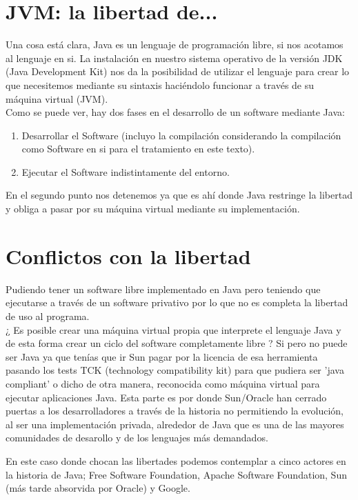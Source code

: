 \documentclass[11pt]{scrartcl}
\begin{document}
\section{JVM: la libertad de...}

Una cosa está clara, Java es un lenguaje de programación libre, si nos acotamos al lenguaje en si. La instalación en nuestro sistema operativo de la versión JDK (Java Development Kit) nos da la posibilidad de utilizar el lenguaje para crear lo que necesitemos mediante su sintaxis haciéndolo funcionar a través de su máquina virtual (JVM).\\
Como se puede ver, hay dos fases en el desarrollo de un software mediante Java:
\begin{enumerate}
\item Desarrollar el Software (incluyo la compilación considerando la compilación como Software en si para el tratamiento en este texto).
\item Ejecutar el Software indistintamente del entorno.
\end{enumerate}

En el segundo punto nos detenemos ya que es ahí donde Java restringe la libertad y obliga a pasar por su máquina virtual mediante su implementación.

\section{Conflictos con la libertad}

Pudiendo tener un software libre implementado en Java pero teniendo que ejecutarse a través de un software privativo por lo que no es completa la libertad de uso al programa.\\
¿ Es posible crear una máquina virtual propia que interprete el lenguaje Java y de esta forma crear un ciclo del software completamente libre ? Si pero no puede ser Java ya que tenías que ir Sun pagar por la licencia de esa herramienta pasando los tests TCK (technology compatibility kit) para que pudiera ser 'java compliant' o dicho de otra manera, reconocida como máquina virtual para ejecutar aplicaciones Java.
Esta parte es por donde Sun/Oracle han cerrado puertas a los desarrolladores a través de la historia no permitiendo la evolución, al ser una implementación privada, alrededor de Java que es una de las mayores comunidades de desarollo y de los lenguajes más demandados.

En este caso donde chocan las libertades podemos contemplar a cinco actores en la historia de Java; Free Software Foundation, Apache Software Foundation, Sun (más tarde absorvida por Oracle) y Google.
\end{document}
